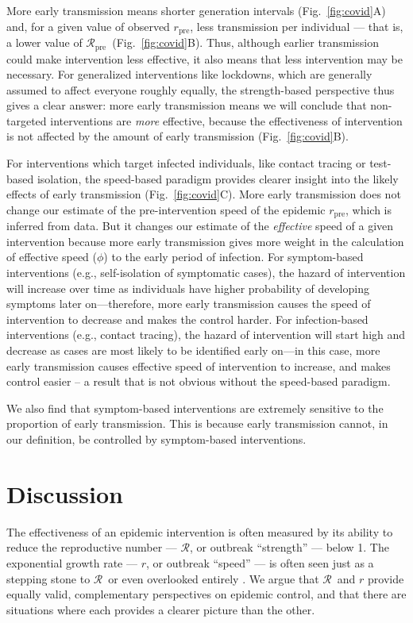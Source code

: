 \documentclass[12pt]{article}
\newcommand{\RR}{\ensuremath{{\mathcal R}}}
\newcommand{\Rx}[1]{\ensuremath{\RR_{\mathrm{#1}}}}
\newcommand{\Rpre}{\Rx{pre}}
\newcommand{\rr}{\ensuremath{{r}}}
\newcommand{\rx}[1]{\ensuremath{\rr_{\mathrm{#1}}}}
\newcommand{\rpre}{\rx{pre}}
\newcommand{\figref}[1]{Fig.~\ref{fig:#1}}
\begin{document}
More early transmission means shorter generation intervals (\figref{covid}A) and, for a given value of observed \rpre, less transmission per individual --- that is, a lower value of \Rpre\ (\figref{covid}B).
Thus, although earlier transmission could make intervention less effective, it also means that less intervention may be necessary. 
For generalized interventions like lockdowns, which are generally assumed to affect everyone roughly equally, the strength-based perspective thus gives a clear answer: more early transmission means we will conclude that non-targeted interventions are \emph{more} effective, because the effectiveness of intervention is not affected by the amount of early transmission (\figref{covid}B).

For interventions which target infected individuals, like contact tracing or test-based isolation, the speed-based paradigm provides clearer insight into the likely effects of early transmission (\figref{covid}C).
More early transmission does not change our estimate of the pre-intervention speed of the epidemic \rpre, which is inferred from data. 
But it changes our estimate of the \emph{effective} speed of a given intervention because more early transmission gives more weight in the calculation of effective speed ($\phi$) to the early period of infection.
For symptom-based interventions (e.g., self-isolation of symptomatic cases), the hazard of intervention will increase over time as individuals have higher probability of developing symptoms later on---therefore, more early transmission causes the speed of intervention to decrease and makes the control harder.
For infection-based interventions (e.g., contact tracing), the hazard of intervention will start high and decrease as cases are most likely to be identified early on---in this case, more early transmission causes effective speed of intervention to increase, and makes control easier -- a result that is not obvious without the speed-based paradigm.

We also find that symptom-based interventions are extremely sensitive to the proportion of early transmission. This is because early transmission cannot, in our definition, be controlled by symptom-based interventions.

\section{Discussion}

The effectiveness of an epidemic intervention is often measured by its ability to reduce the reproductive number --- \RR, or outbreak ``strength'' --- below 1. The exponential growth rate --- $r$, or outbreak ``speed'' --- is often seen just as a stepping stone to \RR\, or even overlooked entirely \citep{park2020reconciling}.
We argue that \RR\ and $r$ provide equally valid, complementary perspectives on epidemic control, and that there are situations where each provides a clearer picture than the other.
\end{document}
